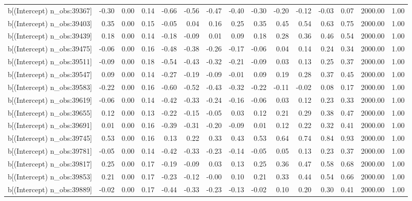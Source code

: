 \begin{table}[ht]
\begin{tabular}{rrrrrrrrrrrrrrr}
  b[(Intercept) n\_obs:39367] & -0.30 & 0.00 & 0.14 & -0.66 & -0.56 & -0.47 & -0.40 & -0.30 & -0.20 & -0.12 & -0.03 & 0.07 & 2000.00 & 1.00 \\ 
  b[(Intercept) n\_obs:39403] & 0.35 & 0.00 & 0.15 & -0.05 & 0.04 & 0.16 & 0.25 & 0.35 & 0.45 & 0.54 & 0.63 & 0.75 & 2000.00 & 1.00 \\ 
  b[(Intercept) n\_obs:39439] & 0.18 & 0.00 & 0.14 & -0.18 & -0.09 & 0.01 & 0.09 & 0.18 & 0.28 & 0.36 & 0.46 & 0.54 & 2000.00 & 1.00 \\ 
  b[(Intercept) n\_obs:39475] & -0.06 & 0.00 & 0.16 & -0.48 & -0.38 & -0.26 & -0.17 & -0.06 & 0.04 & 0.14 & 0.24 & 0.34 & 2000.00 & 1.00 \\ 
  b[(Intercept) n\_obs:39511] & -0.09 & 0.00 & 0.18 & -0.54 & -0.43 & -0.32 & -0.21 & -0.09 & 0.03 & 0.13 & 0.25 & 0.37 & 2000.00 & 1.00 \\ 
  b[(Intercept) n\_obs:39547] & 0.09 & 0.00 & 0.14 & -0.27 & -0.19 & -0.09 & -0.01 & 0.09 & 0.19 & 0.28 & 0.37 & 0.45 & 2000.00 & 1.00 \\ 
  b[(Intercept) n\_obs:39583] & -0.22 & 0.00 & 0.16 & -0.60 & -0.52 & -0.43 & -0.32 & -0.22 & -0.11 & -0.02 & 0.08 & 0.17 & 2000.00 & 1.00 \\ 
  b[(Intercept) n\_obs:39619] & -0.06 & 0.00 & 0.14 & -0.42 & -0.33 & -0.24 & -0.16 & -0.06 & 0.03 & 0.12 & 0.23 & 0.33 & 2000.00 & 1.00 \\ 
  b[(Intercept) n\_obs:39655] & 0.12 & 0.00 & 0.13 & -0.22 & -0.15 & -0.05 & 0.03 & 0.12 & 0.21 & 0.29 & 0.38 & 0.47 & 2000.00 & 1.00 \\ 
  b[(Intercept) n\_obs:39691] & 0.01 & 0.00 & 0.16 & -0.39 & -0.31 & -0.20 & -0.09 & 0.01 & 0.12 & 0.22 & 0.32 & 0.41 & 2000.00 & 1.00 \\ 
  b[(Intercept) n\_obs:39745] & 0.53 & 0.00 & 0.16 & 0.13 & 0.22 & 0.33 & 0.43 & 0.53 & 0.64 & 0.74 & 0.84 & 0.93 & 2000.00 & 1.00 \\ 
  b[(Intercept) n\_obs:39781] & -0.05 & 0.00 & 0.14 & -0.42 & -0.33 & -0.23 & -0.14 & -0.05 & 0.05 & 0.13 & 0.23 & 0.37 & 2000.00 & 1.00 \\ 
  b[(Intercept) n\_obs:39817] & 0.25 & 0.00 & 0.17 & -0.19 & -0.09 & 0.03 & 0.13 & 0.25 & 0.36 & 0.47 & 0.58 & 0.68 & 2000.00 & 1.00 \\ 
  b[(Intercept) n\_obs:39853] & 0.21 & 0.00 & 0.17 & -0.23 & -0.12 & -0.00 & 0.10 & 0.21 & 0.33 & 0.44 & 0.54 & 0.66 & 2000.00 & 1.00 \\ 
  b[(Intercept) n\_obs:39889] & -0.02 & 0.00 & 0.17 & -0.44 & -0.33 & -0.23 & -0.13 & -0.02 & 0.10 & 0.20 & 0.30 & 0.41 & 2000.00 & 1.00 \\ 

\end{tabular}
\end{table}
